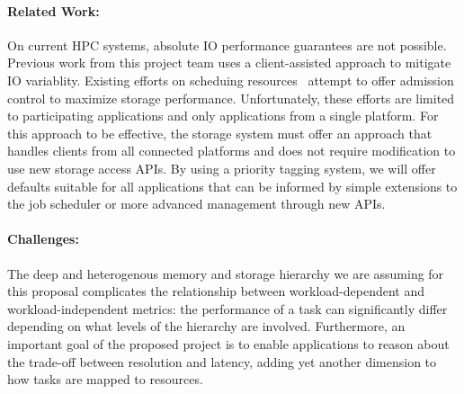 \paragraph{Related Work:} On current HPC systems, absolute IO performance
guarantees are not possible. Previous work \cite{lofstead:2010:io-variability,liu_hotstorage} 
from this project team uses a client-assisted approach to mitigate IO variablity.
Existing efforts on scheduing resources~\cite{thapaliya:2014:io-cop,dorier:2014:calciom} attempt to offer
admission control to maximize storage performance. Unfortunately, these efforts
are limited to participating applications and only applications from a single
platform. For this approach to be effective, the storage system must offer an
approach that handles clients from all connected platforms and does not
require modification to use new storage access APIs. By using a priority
tagging system, we will offer defaults suitable for all applications that can
be informed by simple extensions to the job scheduler or more advanced
management through new APIs.

\paragraph{Challenges:} The deep and heterogenous memory and storage
hierarchy we are assuming for this proposal complicates the
relationship between workload-dependent and workload-independent
metrics: the performance of a task can significantly differ depending
on what levels of the hierarchy are involved. Furthermore, an
important goal of the proposed project is to enable applications
to reason about the trade-off between resolution and latency, adding
yet another dimension to how tasks are mapped to resources.

